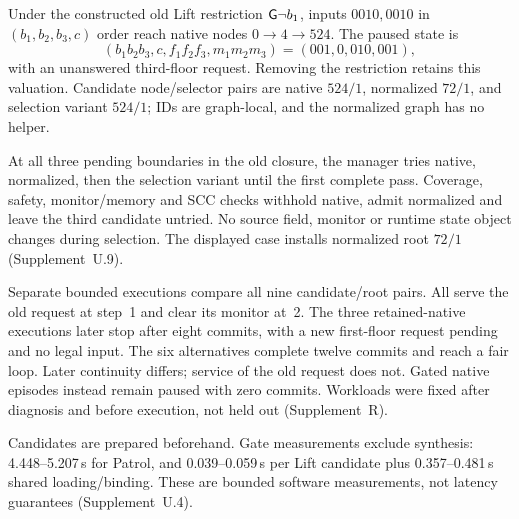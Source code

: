 \label{sec:runtime-admission}
Under the constructed old Lift restriction $\mathsf{G}\neg b_1$, inputs
$0010,0010$ in $(b_1,b_2,b_3,c)$ order reach native nodes
$0\to4\to524$. The paused state is
\[
(b_1b_2b_3,c,f_1f_2f_3,m_1m_2m_3)=(001,0,010,001),
\]
with an unanswered third-floor request. Removing the restriction retains
this valuation. Candidate node/selector pairs are native $524/1$,
normalized $72/1$, and selection variant $524/1$; IDs are graph-local,
and the normalized graph has no helper.

At all three pending boundaries in the old closure, the manager tries
native, normalized, then the selection variant until the first complete
pass. Coverage, safety, monitor/memory and SCC checks withhold native,
admit normalized and leave the third candidate untried. No source field,
monitor or runtime state object changes during selection. The displayed
case installs normalized root $72/1$ (Supplement~U.9).

Separate bounded executions compare all nine candidate/root pairs.
All serve the old request at step~1 and clear its monitor at~2.
The three retained-native executions later stop after eight commits,
with a new first-floor request pending and no legal input. The six
alternatives complete twelve commits and reach a fair loop. Later
continuity differs; service of the old request does not. Gated native
episodes instead remain paused with zero commits. Workloads were fixed
after diagnosis and before execution, not held out (Supplement~R).

Candidates are prepared beforehand. Gate measurements exclude synthesis:
4.448--5.207\,s for Patrol, and 0.039--0.059\,s per Lift candidate plus
0.357--0.481\,s shared loading/binding. These are bounded software
measurements, not latency guarantees (Supplement~U.4).
